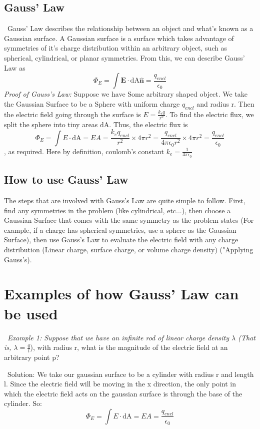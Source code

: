 \documentclass{report}
\begin{document}
\subsection{Gauss' Law}
\ Gauss' Law describes the relationship between an object and what's known as a Gaussian surface. A Gaussian surface is a surface which takes advantage of symmetries of it's charge distribution within an arbitrary object, such as spherical, cylindrical, or planar symmetries. From this, we can describe Gauss' Law as $$\Phi_E=\int \mathbf{E}\cdot\mathrm{dA}\hat{\mathbf{n}}=\frac{q_{encl}}{\epsilon_0}$$ 
\textit{Proof of Gauss's Law:}
Suppose we have Some arbitrary shaped object. We take the Gaussian Surface to be a Sphere with uniform charge $q_{encl}$ and radius r. Then the electric field going through the surface is $E=\frac{k_eq}{r^2}$. To find the electric flux, we split the sphere into tiny areas $\mathrm{dA}$. Thus, the electric flux is $$\Phi_E=\int E\cdot\mathrm{dA}=EA=\frac{k_eq_{encl}}{r^2}\times4\pi r^2=\frac{q_{encl}}{4\pi\epsilon_0r^2}\times 4\pi r^2=\frac{q_{encl}}{\epsilon_0}$$, as required. Here by definition, coulomb's constant $k_e=\frac{1}{4\pi\epsilon_0}$
\subsection{How to use Gauss' Law}
The steps that are involved with Gauss's Law are quite simple to follow. First, find any symmetries in the problem (like cylindrical, etc...), then choose a Gaussian Surface that comes with the same symmetry as the problem states (For example, if a charge has spherical symmetries, use a sphere as the Gaussian Surface), then use Gauss's Law to evaluate the electric field with any charge distribution (Linear charge, surface charge, or volume charge density) ("Applying Gauss's). 

\section{Examples of how Gauss' Law can be used}
\ \textit{Example 1: Suppose that we have an infinite rod of linear charge density $\lambda$ (That is, $\lambda=\frac{q}{l}$}), with radius r, what is the magnitude of the electric field at an arbitrary point p?

\ Solution: We take our gaussian surface to be a cylinder with radius r and length l. Since the electric field will be moving in the x direction, the only point in which the electric field acts on the gaussian surface is through the base of the cylinder. So: $$\Phi_E=\int E\cdot\mathrm{dA}=EA=\frac{q_{encl}}{\epsilon_0}$$
\end{document}
